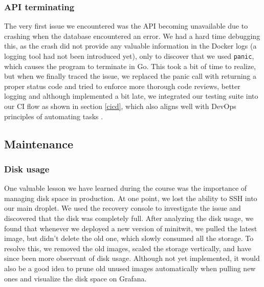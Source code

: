 \subsubsection{API terminating}
The very first issue we encountered was the API becoming unavailable due to crashing when the database encountered an error. We had a hard time debugging this, as the crash did not provide any valuable information in the Docker logs (a logging tool had not been introduced yet), only to discover that we used \texttt{panic}, which causes the program to terminate in Go. This took a bit of time to realize, but when we finally traced the issue, we replaced the panic call with returning a proper status code and tried to enforce more thorough code reviews, better logging and although implemented a bit late, we integrated our testing suite into our CI flow as shown in section \ref{cicd}, which also aligns well with DevOps principles of automating tasks \cite{devopsculture}.

\subsection{Maintenance}\label{maintainence}
\subsubsection{Disk usage}
One valuable lesson we have learned during the course was the importance of managing disk space in production. At one point, we lost the ability to SSH into our main droplet. We used the recovery console to investigate the issue and discovered that the disk was completely full. After analyzing the disk usage, we found that whenever we deployed a new version of minitwit, we pulled the latest image, but didn't delete the old one, which slowly consumed all the storage. To resolve this, we removed the old images, scaled the storage vertically, and have since been more observant of disk usage. Although not yet implemented, it would also be a good idea to prune old unused images automatically when pulling new ones and visualize the disk space on Grafana.